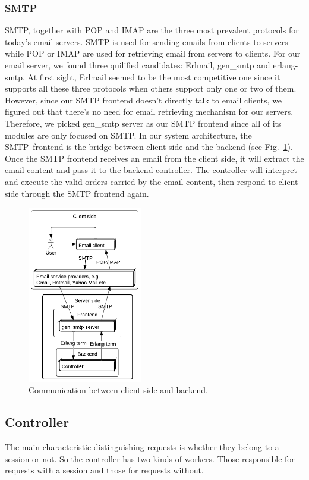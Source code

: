 \documentclass[11pt,a4paper]{report}
\begin{document}
\subsubsection{SMTP}
SMTP, together with POP and IMAP are the three most prevalent protocols for
today's email servers.
SMTP is used for sending emails from clients to servers while POP or IMAP
are used for retrieving email from servers to clients.
For our email server, we found three quilified candidates: Erlmail, gen\_smtp
and erlang-smtp.
At first sight, Erlmail seemed to be the most competitive one since it 
supports all these three protocols when others support only one or two of them.
However, since our SMTP frontend doesn't directly talk to email clients, we
figured out that there's no need for email retrieving mechanism for our
servers. Therefore, we picked gen\_smtp server as our SMTP frontend since all
of its modules are only focused on SMTP. In our system architecture, the
SMTP~frontend is the bridge between client side and the backend
(see Fig.~\ref{fig:smtp_arch}).
Once the SMTP frontend receives an email from the client side, it will extract
the email content and pass it to the backend controller. The controller will
interpret and execute the valid orders carried by the email content, then
respond to client side through the SMTP frontend again.

\begin{figure}[h]
 \centering
 \includegraphics[width=5cm]{./graphics/smtp_arch.pdf}
 \caption{Communication between client side and backend.}
 \label{fig:smtp_arch}
\end{figure}

\subsection{Controller}
The main characteristic distinguishing requests is whether they belong to a
session or not.
So the controller has two kinds of workers.
Those responsible for requests with a session and those for requests without.
\end{document}
